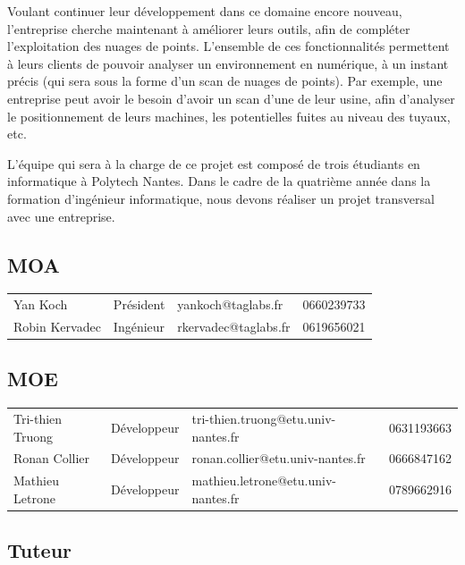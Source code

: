 \documentclass[12pt,titlepage,french]{article}
\begin{document}
Voulant continuer leur développement dans ce domaine encore nouveau, l'entreprise cherche maintenant à améliorer leurs outils, afin de compléter l'exploitation des nuages de points. L'ensemble de ces fonctionnalités permettent à leurs clients de pouvoir analyser un environnement en numérique, à un instant précis (qui sera sous la forme d'un scan de nuages de points). Par exemple, une entreprise peut avoir le besoin d'avoir un scan d'une de leur usine, afin d'analyser le positionnement de leurs machines, les potentielles fuites au niveau des tuyaux, etc.

L'équipe qui sera à la charge de ce projet est composé de trois étudiants en informatique à Polytech Nantes. Dans le cadre de la quatrième année dans la formation d'ingénieur informatique, nous devons réaliser un projet transversal avec une entreprise.

\subsection*{MOA}

\noindent\begin{tabu} to \textwidth {X[c]X[c]X[c]X[c]}\toprule
   &&        &\\\toprule
      Yan Koch&   Président&  yankoch@taglabs.fr&    0660239733\\\midrule
Robin Kervadec&   Ingénieur&rkervadec@taglabs.fr&    0619656021\\\bottomrule
\end{tabu}

\subsection*{MOE}

\noindent\begin{tabu} to \textwidth {X[c2]X[c]X[c3]X[c]}\toprule
     &&                       &\\\toprule
Tri-thien Truong& Développeur&tri-thien.truong@etu.univ-nantes.fr&    0631193663\\\midrule
   Ronan Collier& Développeur&   ronan.collier@etu.univ-nantes.fr&    0666847162\\\midrule
 Mathieu Letrone& Développeur& mathieu.letrone@etu.univ-nantes.fr&    0789662916\\\bottomrule
\end{tabu}

\subsection*{Tuteur}
\end{document}

